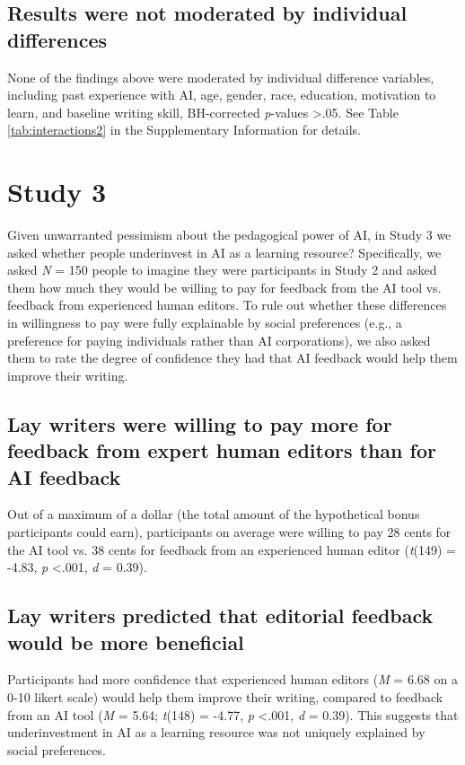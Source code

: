 \documentclass[11pt]{report}
\begin{document}
\begin{mainf}
\subsection*{Results were not moderated by individual differences}
None of the findings above were moderated by individual difference
variables, including past experience with AI, age, gender, race,
education, motivation to learn, and baseline writing skill, BH-corrected
\textit{p}-values \textgreater .05. See Table \ref{tab:interactions2} in
the Supplementary Information for details.

\section*{Study 3}
Given unwarranted pessimism about the pedagogical power of AI, in Study 3 we asked whether people underinvest in AI as a learning resource? 
Specifically, we asked \textit{N} = 150 people to imagine they were participants in Study 2 and asked them how much they would be willing to pay for feedback from the AI tool vs. feedback from experienced human editors. To rule out whether these differences in willingness to pay were fully explainable by social preferences (e.g., a preference for paying individuals rather than AI corporations), we also asked them to rate the degree of confidence they had that AI feedback would help them improve their writing.

\subsection*{Lay writers were willing to pay more for feedback from expert human editors than for AI feedback}

Out of a maximum of a dollar (the total amount of the hypothetical bonus participants could earn), participants on average were willing to pay 28 cents for the AI tool vs. 38 cents for feedback from an experienced human editor (\textit{t}(149) = -4.83, \textit{p} \textless .001, \textit{d} = 0.39).

\subsection*{Lay writers predicted that editorial feedback would be more beneficial}

Participants had more confidence that experienced human editors (\textit{M} = 6.68 on a 0-10 likert scale) would help them improve their writing, compared to feedback from an AI tool (\textit{M} = 5.64; \textit{t}(148) = -4.77, \textit{p} \textless .001, \textit{d} = 0.39). This suggests that underinvestment in AI as a learning resource was not uniquely explained by social preferences.


\end{mainf}
\end{document}
